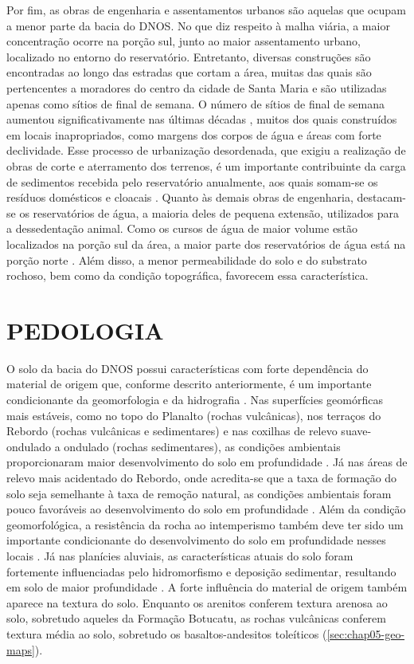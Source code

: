 Por fim, as obras de engenharia e assentamentos urbanos são aquelas que ocupam a menor parte da bacia do DNOS. 
No que diz respeito à malha viária, a maior concentração ocorre na porção sul, junto ao maior assentamento 
urbano, localizado no entorno do reservatório. Entretanto, diversas construções são encontradas ao longo das 
estradas que cortam a área, muitas das quais são pertencentes a moradores do centro da cidade de Santa Maria e 
são utilizadas apenas como sítios de final de semana. O número de sítios de final de semana aumentou 
significativamente nas últimas décadas \cite{Goldani2006}, muitos dos quais construídos em locais 
inapropriados, como margens dos corpos de água e áreas com forte declividade. Esse processo de urbanização 
desordenada, que exigiu a realização de obras de corte e aterramento dos terrenos, é um importante 
contribuinte da carga de sedimentos recebida pelo reservatório anualmente, aos quais somam-se os resíduos 
domésticos e cloacais \cite{Goldani2006, PaivaEtAl2001, DillEtAl2004, MiguelEtAl2014}. Quanto às demais obras 
de engenharia, destacam-se os reservatórios de água, a maioria deles de pequena extensão, utilizados para a 
dessedentação animal. Como os cursos de água de maior volume estão localizados na porção sul da área, a maior 
parte dos reservatórios de água está na porção norte \cite{SamuelRosaEtAl2011a}. Além disso, a menor 
permeabilidade do solo e do substrato rochoso, bem como da condição topográfica, favorecem essa 
característica.

\section{PEDOLOGIA}

O solo da bacia do DNOS possui características com forte dependência do material de origem que, conforme 
descrito anteriormente, é um importante condicionante da geomorfologia e da hidrografia 
\cite{NascimentoEtAl2010}. Nas superfícies geomórficas mais estáveis, como no topo do Planalto (rochas 
vulcânicas), nos terraços do Rebordo (rochas vulcânicas e sedimentares) e nas coxilhas de relevo 
suave-ondulado a ondulado (rochas sedimentares), as condições ambientais proporcionaram maior desenvolvimento 
do solo em profundidade \cite{Moser1990}. Já nas áreas de relevo mais acidentado do Rebordo, onde acredita-se 
que a taxa de formação do solo seja semelhante à taxa de remoção natural, as condições ambientais foram pouco 
favoráveis ao desenvolvimento do solo em profundidade \cite{Moser1990, DalmolinEtAl2006a, Sturmer2008, 
SamuelRosaEtAl2011a}. Além da condição geomorfológica, a resistência da rocha ao intemperismo também deve ter 
sido um importante condicionante do desenvolvimento do solo em profundidade nesses locais \cite{Pedron2007}. 
Já nas planícies aluviais, as características atuais do solo foram fortemente influenciadas pelo hidromorfismo 
e deposição sedimentar, resultando em solo de maior profundidade \cite{Moser1990, Miguel2010}. A forte 
influência do material de origem também aparece na textura do solo. Enquanto os arenitos conferem textura 
arenosa ao solo, sobretudo aqueles da Formação Botucatu, as rochas vulcânicas conferem textura média ao solo, 
sobretudo os basaltos-andesitos toleíticos (\autoref{sec:chap05-geo-maps}).

